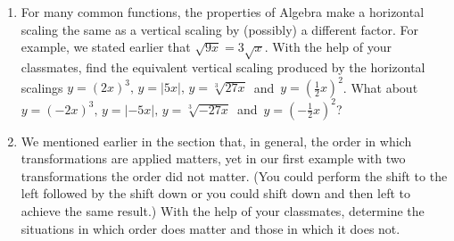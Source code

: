 \begin{enumerate}
\[\begin{array}{cc}
\begin{mfpic}[10]{-12}{9}{-6}{6}
\point[3pt]{(-11,3), (-4,1), (-3,-1), (-2,-3), (5,-5)}
\axes
\tlabel[cc](9,-0.5){\scriptsize $x$}
\tlabel[cc](0.5,6){\scriptsize $y$}
\xmarks{-11 step 1 until 8}
\ymarks{-5 step 1 until 5}
\tlpointsep{4pt}
\axislabels {x}{{\tiny $-11 \hspace{6pt}$} -11, {\tiny $-10 \hspace{6pt}$} -10, {\tiny $-9 \hspace{6pt}$} -9, {\tiny $-8 \hspace{6pt}$} -8, {\tiny $-7 \hspace{6pt}$} -7, {\tiny $-6 \hspace{6pt}$} -6, {\tiny $-5 \hspace{6pt}$} -5, {\tiny $-4 \hspace{6pt}$} -4, {\tiny $-3 \hspace{6pt}$} -3, {\tiny $-2 \hspace{6pt}$} -2, {\tiny $-1 \hspace{6pt}$} -1, {\tiny $1$} 1, {\tiny $2$} 2, {\tiny $3$} 3, {\tiny $4$} 4, {\tiny $5$} 5, {\tiny $6$} 6, {\tiny $7$} 7, {\tiny $8$} 8}
\axislabels {y}{{\tiny $-5$} -5, {\tiny $-4$} -4, {\tiny $-3$} -3, {\tiny $-2$} -2, {\tiny $-1$} -1, {\tiny $1$} 1, {\tiny $2$} 2, {\tiny $3$} 3, {\tiny $4$} 4, {\tiny $5$} 5}
\arrow \reverse \arrow \parafcn{-2.1,2.1,0.1}{((t**3 - 3),((-2*t) - 1))}
\tcaption{\scriptsize $y = g(x)$}
\end{mfpic}

\end{array} \]

\item For many common functions, the properties of Algebra make a horizontal scaling the same as a vertical scaling by (possibly) a different factor.  For example, we stated earlier that $\sqrt{9x} = 3\sqrt{x}$.  With the help of your classmates, find the equivalent vertical scaling produced by the horizontal scalings $y = (2x)^{3}, \, y = |5x|, \, y = \sqrt[3]{27x} \, $ and $\, y = \left(\frac{1}{2} x\right)^{2}$.  What about $y = (-2x)^{3}, \, y = |-5x|, \, y = \sqrt[3]{-27x}\, $ and $\, y = \left(-\frac{1}{2} x\right)^{2}$?

\item We mentioned earlier in the section that, in general, the order in which transformations are applied matters, yet in our first example with two transformations the order did not matter. (You could perform the shift to the left followed by the shift down or you could shift down and then left to achieve the same result.)  With the help of your classmates, determine the situations in which order does matter and those in which it does not.


\end{enumerate}
